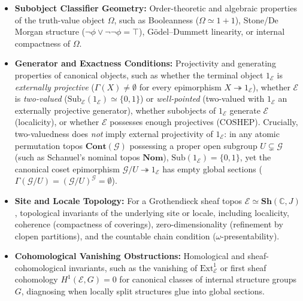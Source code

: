 \begin{itemize}

  \item \textbf{Subobject Classifier Geometry:} Order-theoretic and algebraic properties of the truth-value object $\Omega$, such as Booleanness ($\Omega \simeq 1+1$), Stone/De Morgan structure ($\neg\phi \vee \neg\neg\phi = \top$), G\"odel--Dummett linearity, or internal compactness of $\Omega$.

  \item \textbf{Generator and Exactness Conditions:} Projectivity and generating properties of canonical objects, such as whether the terminal object $1_{\mathcal{E}}$ is \emph{externally projective} ($\Gamma(X) \neq \emptyset$ for every epimorphism $X \twoheadrightarrow 1_{\mathcal{E}}$), whether $\mathcal{E}$ is \emph{two-valued} ($\mathrm{Sub}_{\mathcal{E}}(1_{\mathcal{E}}) \simeq \{0, 1\}$) or \emph{well-pointed} (two-valued with $1_{\mathcal{E}}$ an externally projective generator), whether subobjects of $1_{\mathcal{E}}$ generate $\mathcal{E}$ (localicity), or whether $\mathcal{E}$ possesses enough projectives ($\mathrm{COSHEP}$). Crucially, two-valuedness does \emph{not} imply external projectivity of $1_{\mathcal{E}}$: in any atomic permutation topos $\mathbf{Cont}(\mathcal{G})$ possessing a proper open subgroup $U \subsetneq \mathcal{G}$ (such as Schanuel's nominal topos $\mathbf{Nom}$), $\mathrm{Sub}(1_{\mathcal{E}}) = \{0, 1\}$, yet the canonical coset epimorphism $\mathcal{G}/U \twoheadrightarrow 1_{\mathcal{E}}$ has empty global sections ($\Gamma(\mathcal{G}/U) = (\mathcal{G}/U)^{\mathcal{G}} = \emptyset$).

  \item \textbf{Site and Locale Topology:} For a Grothendieck sheaf topos $\mathcal{E} \simeq \mathbf{Sh}(\mathbb{C}, J)$, topological invariants of the underlying site or locale, including localicity, coherence (compactness of coverings), zero-dimensionality (refinement by clopen partitions), and the countable chain condition ($\omega$-presentability).

  \item \textbf{Cohomological Vanishing Obstructions:} Homological and sheaf-cohomological invariants, such as the vanishing of $\mathrm{Ext}^1_{\mathcal{E}}$ or first sheaf cohomology $H^1(\mathcal{E}, G) = 0$ for canonical classes of internal structure groups $G$, diagnosing when locally split structures glue into global sections.

\end{itemize}

